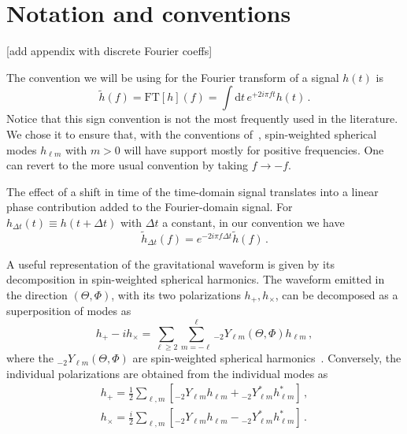 \documentclass[aps,showpacs,twocolumn,
prd,superscriptaddress,nofootinbib]{revtex4-1}
\newcommand{\be}{\begin{equation}}
\newcommand{\ee}{\end{equation}}
\newcommand\ud{{\mathrm{d}}}
\newcommand{\SM}[1]{{\color{Red} #1}}
\begin{document}

\appendix

\section{Notation and conventions}
\label{app:notation}

\SM{[add appendix with discrete Fourier coeffs]}

The convention we will be using for the Fourier transform of a signal $h(t)$ is
\be\label{eq:defFT}
	\tilde{h}(f) = \mathrm{FT}[h](f) =  \int \ud t \, e^{+2i\pi f t} h(t) \,.
\ee
Notice that this sign convention is not the most frequently used in the literature. We chose it to ensure that, with the conventions of~\cite{BlanchetLiving}, spin-weighted spherical modes $h_{\ell m}$ with $m>0$ will have support mostly for positive frequencies. One can revert to the more usual convention by taking $f\rightarrow -f$.

The effect of a shift in time of the time-domain signal translates into a linear phase contribution added to the Fourier-domain signal. For $h_{\Delta t}(t) \equiv h(t+\Delta t)$ with $\Delta t$ a constant, in our convention we have
\be\label{eq:shifttime}
	\tilde{h}_{\Delta t} (f) = e^{-2i\pi f \Delta t} \tilde{h}(f) \,.
\ee

A useful representation of the gravitational waveform is given by its decomposition in spin-weighted spherical harmonics. The waveform emitted in the direction $(\Theta, \Phi)$, with its two polarizations $h_{+},h_{\times}$, can be decomposed as a superposition of modes as~\cite{Thorne80}
\be\label{eq:defmodes}
	h_{+} - i h_{\times} = \sum\limits_{\ell \geq 2} \sum\limits_{m=-\ell}^{\ell} {}_{-2}Y_{\ell m}(\Theta,\Phi) h_{\ell m} \,,
\ee
where the ${}_{-2}Y_{\ell m}(\Theta,\Phi)$ are spin-weighted spherical harmonics~\cite{Goldberg+67}. Conversely, the individual polarizations are obtained from the individual modes as
\begin{subequations}
\begin{align}
	h_{+} = \frac{1}{2} \sum\limits_{\ell, m} \left[ {}_{-2}Y_{\ell m}h_{\ell m} + {}_{-2}Y_{\ell m}^{*} h_{\ell m}^{*} \right] \,,\\
	h_{\times} = \frac{i}{2} \sum\limits_{\ell, m} \left[ {}_{-2}Y_{\ell m}h_{\ell m} - {}_{-2}Y_{\ell m}^{*} h_{\ell m}^{*} \right] \,.
\end{align}
\end{subequations}
\end{document}
